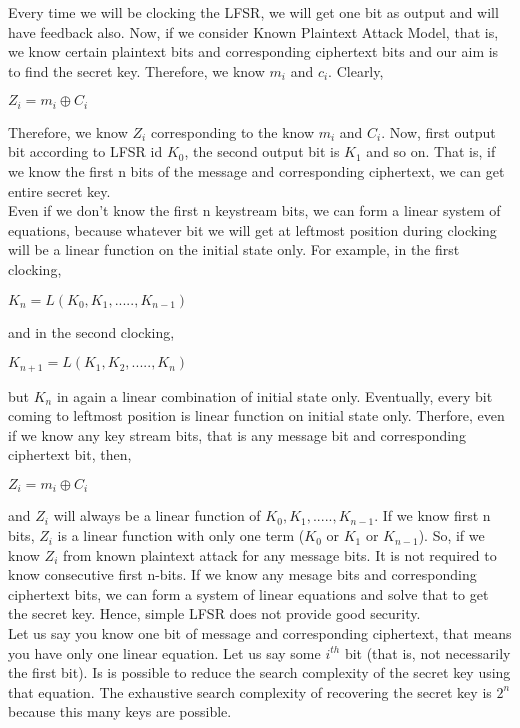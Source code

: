 \documentclass[11pt]{article}
\begin{document}
Every time we will be clocking the LFSR, we will get one bit as output and will have feedback also. Now, if we consider Known Plaintext Attack Model, that is, we know certain plaintext bits and corresponding ciphertext bits and our aim is to find the secret key. Therefore, we know $m_i$ and $c_i$. Clearly,
\begin{center}
    $Z_i = m_i \oplus C_i$
\end{center}
Therefore, we know $Z_i$ corresponding to the know $m_i$ and $C_i$. Now, first output bit according to LFSR id $K_0$, the second output bit is $K_1$ and so on. That is, if we know the first n bits of the message and corresponding ciphertext, we can get entire secret key.\\
\newline
Even if we don't know the first n keystream bits, we can form a linear system of equations, because whatever bit we will get at leftmost position during clocking will be a linear function on the initial state only. For example, in the first clocking, 
\begin{center}
    $K_n = L(K_0, K_1,....., K_{n-1})$
\end{center}
and in the second clocking,
\begin{center}
    $K_{n+1} = L(K_1, K_2,....., K_n)$
\end{center}
but $K_n$ in again a linear combination of initial state only. Eventually, every bit coming to leftmost position is linear function on initial state only. Therfore, even if we know any key stream bits, that is any message bit and corresponding ciphertext bit, then,
\begin{center}
    $Z_i = m_i \oplus C_i$
\end{center}
and $Z_i$ will always be a linear function of $K_0, K_1,....., K_{n-1}$. If we know first n bits, $Z_i$ is a linear function with only one term ($K_0$ or $K_1$ or $K_{n-1}$). So, if we know $Z_i$ from known plaintext attack for any message bits. It is not required to know consecutive first n-bits. If we know any mesage bits and corresponding ciphertext bits, we can form a system of linear equations and solve that to get the secret key. Hence, simple LFSR does not provide good security.\\
\newline
Let us say you know one bit of message and corresponding ciphertext, that means you have only one linear equation. Let us say some $i^{th}$ bit (that is, not necessarily the first bit). Is is possible to reduce the search complexity of the secret key using that equation. The exhaustive search complexity of recovering the secret key is $2^n$ because this many keys are possible.\\
\end{document}
